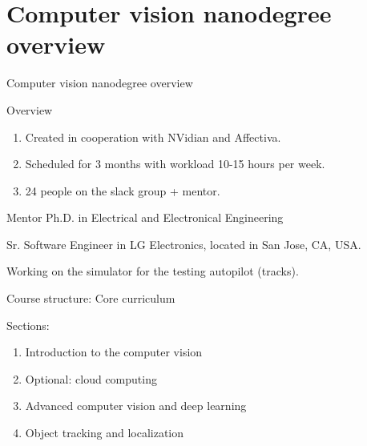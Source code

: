 \documentclass{beamer}
\begin{document}
\section{Computer vision nanodegree overview}

\begin{frame}
\begin{center}
\Huge Computer vision nanodegree overview
\end{center}
\end{frame}

\begin{frame}{Overview}
\begin{enumerate}
\item Created in cooperation with NVidian and Affectiva.
\item Scheduled for 3 months with workload 10-15 hours per week.
\item 24 people on the slack group + mentor.
\end{enumerate}
\end{frame}

\begin{frame}{Mentor}
Ph.D. in Electrical and Electronical Engineering

Sr. Software Engineer in LG Electronics, located in San Jose, CA, USA.

Working on the simulator for the testing autopilot (tracks).
\end{frame}


\begin{frame}{Course structure: Core curriculum}

Sections:
\begin{enumerate}
\item Introduction to the computer vision
\item Optional: cloud computing
\item Advanced computer vision and deep learning
\item Object tracking and localization
\end{enumerate}
\end{frame}
\end{document}

